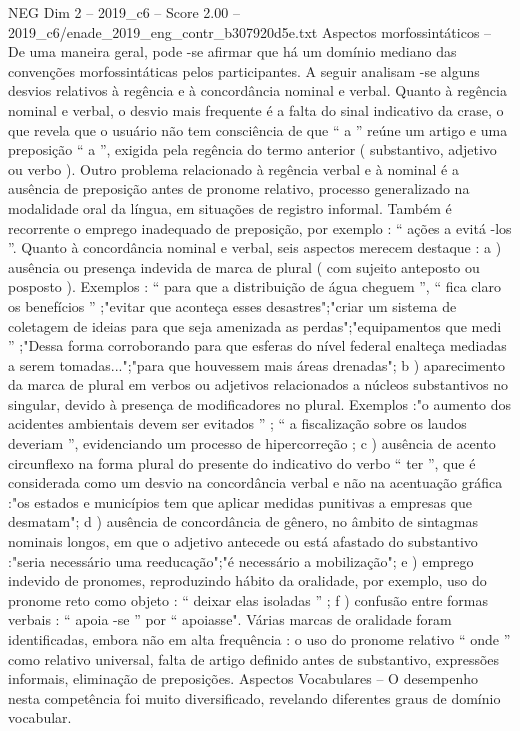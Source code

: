 \begin{textsample}{NEG Dim 2 – 2019\_c6 – Score 2.00 – 2019\_c6/enade\_2019\_eng\_contr\_b307920d5e.txt}
Aspectos morfossintáticos – De uma maneira geral, pode -se afirmar que há um domínio mediano das convenções morfossintáticas pelos participantes.
A seguir analisam -se alguns desvios relativos à regência e à concordância nominal e verbal.
Quanto à regência nominal e verbal, o desvio mais frequente é a falta do sinal indicativo da crase, o que revela que o usuário não tem consciência de que “ a ” reúne um artigo e uma preposição “ a ”, exigida pela regência do termo anterior ( substantivo, adjetivo ou verbo ).
Outro problema relacionado à regência verbal e à nominal é a ausência de preposição antes de pronome relativo, processo generalizado na modalidade oral da língua, em situações de registro informal.
Também é recorrente o emprego inadequado de preposição, por exemplo : “ ações a evitá -los ”.
Quanto à concordância nominal e verbal, seis aspectos merecem destaque : a ) ausência ou presença indevida de marca de plural ( com sujeito anteposto ou posposto ).
Exemplos : “ para que a distribuição de água cheguem ”, “ fica claro os benefícios ” ;"evitar que aconteça esses desastres";"criar um sistema de coletagem de ideias para que seja amenizada as perdas";"equipamentos que medi ” ;"Dessa forma corroborando para que esferas do nível federal enalteça mediadas a serem tomadas...";"para que houvessem mais áreas drenadas"; b ) aparecimento da marca de plural em verbos ou adjetivos relacionados a núcleos substantivos no singular, devido à presença de modificadores no plural.
Exemplos :"o aumento dos acidentes ambientais devem ser evitados ” ; “ a fiscalização sobre os laudos deveriam ”, evidenciando um processo de hipercorreção ; c ) ausência de acento circunflexo na forma plural do presente do indicativo do verbo “ ter ”, que é considerada como um desvio na concordância verbal e não na acentuação gráfica :"os estados e municípios tem que aplicar medidas punitivas a empresas que desmatam"; d ) ausência de concordância de gênero, no âmbito de sintagmas nominais longos, em que o adjetivo antecede ou está afastado do substantivo :"seria necessário uma reeducação";"é necessário a mobilização"; e ) emprego indevido de pronomes, reproduzindo hábito da oralidade, por exemplo, uso do pronome reto como objeto : “ deixar elas isoladas ” ; f ) confusão entre formas verbais : “ apoia -se ” por “ apoiasse".
Várias marcas de oralidade foram identificadas, embora não em alta frequência : o uso do pronome relativo “ onde ” como relativo universal, falta de artigo definido antes de substantivo, expressões informais, eliminação de preposições.
Aspectos Vocabulares – O desempenho nesta competência foi muito diversificado, revelando diferentes graus de domínio vocabular.

\end{textsample}
